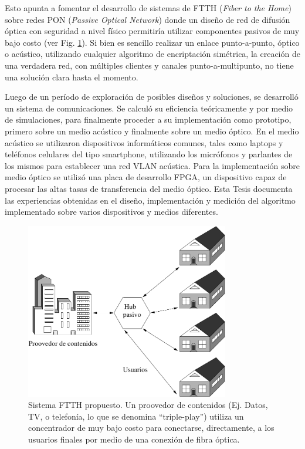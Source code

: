 Esto apunta a fomentar el desarrollo de sistemas de FTTH (\textit{Fiber to the Home}) sobre redes PON (\textit{Passive Optical Network}) \cite{lee2006fiber} donde un diseño de red de difusión óptica con seguridad a nivel físico permitiría utilizar componentes pasivos de muy bajo costo (ver Fig. \ref{arch:ftth}). Si bien es sencillo realizar un enlace punto-a-punto, óptico o acústico, utilizando cualquier algoritmo de encriptación simétrica, la creación de una verdadera red, con múltiples clientes y canales punto-a-multipunto, no tiene una solución clara hasta el momento.

Luego de un período de exploración de posibles diseños y soluciones, se desarrolló un sistema de comunicaciones. Se calculó su eficiencia teóricamente y por medio de simulaciones, para finalmente proceder a su implementación como prototipo, primero sobre un medio acústico y finalmente sobre un medio óptico. 
En el medio acústico se utilizaron dispositivos informáticos comunes, tales como laptops y teléfonos celulares del tipo smartphone, utilizando los micrófonos y parlantes de los mismos para establecer una red VLAN acústica. 
Para la implementación sobre medio óptico se utilizó una placa de desarrollo FPGA, un dispositivo capaz de procesar las altas tasas de transferencia del medio óptico.
Esta Tesis documenta las experiencias obtenidas en el diseño, implementación y medición del algoritmo implementado sobre varios dispositivos y medios diferentes.

\begin{figure}[!t]
  \centering
    \includegraphics[width=3.5in]{graphs/ftth.pdf}
    \caption{Sistema FTTH propuesto. Un proovedor de contenidos (Ej. Datos, TV, o telefonía, lo que se denomina ``triple-play'') utiliza un concentrador de muy bajo costo para conectarse, directamente, a los usuarios finales por medio de una conexión de fibra óptica.}
    \label{arch:ftth}
\end{figure}

